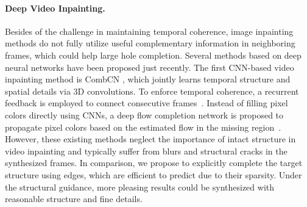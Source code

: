 \paragraph{Deep Video Inpainting.}
Besides of the challenge in maintaining temporal coherence, image inpainting methods do not fully utilize useful complementary information in neighboring frames, which could help large hole completion.
Several methods based on deep neural networks have been proposed just recently.
%
The first CNN-based video inpainting method is CombCN \cite{wang2019video}, which jointly learns temporal structure and spatial details via 3D convolutions.
%
To enforce temporal coherence, a recurrent feedback is employed to connect consecutive frames~\cite{Kim_2019_CVPR,Kim_2019_CVPR1}. 
Instead of filling pixel colors directly using CNNs, a deep flow completion network is proposed to propagate pixel colors based on the estimated flow in the missing region~\cite{Xu_2019_CVPR}.
%
However, these existing methods neglect the importance of intact structure in video inpainting and typically suffer from blurs and structural cracks in the synthesized frames.  
In comparison, we propose to explicitly complete the target structure using edges, which are efficient to predict due to their sparsity. 
Under the structural guidance, more pleasing results could be synthesized with reasonable structure and fine details. 


 


 

























